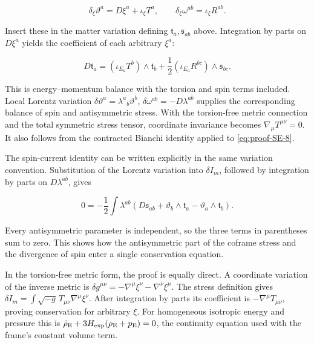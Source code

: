 \documentclass[aps,prx,onecolumn,10pt,notitlepage,nofootinbib,longbibliography]{revtex4-2}
\numberwithin{equation}{section}
\numberwithin{table}{section}
\begin{document}
\begin{equation}
 \delta_\xi \vartheta^a=D\xi^a+\iota_\xi T^a,\qquad
 \delta_\xi\omega^{ab}=\iota_\xi R^{ab}.
 \label{eq:proof-SF-3}
\end{equation}

Insert these in the matter variation defining \(\mathfrak t_a,\mathfrak s_{ab}\) above. Integration by parts on \(D\xi^a\) yields the coefficient of each arbitrary \(\xi^a\):

\begin{equation}
 D\mathfrak t_a=(\iota_{E_a}T^b)\wedge\mathfrak t_b
             +\frac12(\iota_{E_a}R^{bc})\wedge\mathfrak s_{bc}.
 \label{eq:proof-SF-4}
\end{equation}

This is energy--momentum balance with the torsion and spin terms included. Local Lorentz variation \(\delta \vartheta^a=\lambda^a{}_b\vartheta^b\), \(\delta\omega^{ab}=-D\lambda^{ab}\) supplies the corresponding balance of spin and antisymmetric stress. With the torsion-free metric connection and the total symmetric stress tensor, coordinate invariance becomes \(\nabla_\mu T^{\mu\nu}=0\). It also follows from the contracted Bianchi identity applied to \eqref{eq:proof-SE-8}.

The spin-current identity can be written explicitly in the same variation convention. Substitution of the Lorentz variation into \(\delta I_m\), followed by integration by parts on \(D\lambda^{ab}\), gives

\begin{equation}
 0=-\frac12\int\lambda^{ab}
       \left(D\mathfrak s_{ab}+\vartheta_b\wedge\mathfrak t_a-\vartheta_a\wedge\mathfrak t_b\right).
 \label{eq:proof-SF-5}
\end{equation}

Every antisymmetric parameter is independent, so the three terms in parentheses sum to zero. This shows how the antisymmetric part of the coframe stress and the divergence of spin enter a single conservation equation.

In the torsion-free metric form, the proof is equally direct. A coordinate variation of the inverse metric is \(\delta g^{\mu\nu}=-\nabla^\mu\xi^\nu-\nabla^\nu\xi^\mu\). The stress definition gives \(\delta I_m=\int\sqrt{-g}\,T_{\mu\nu}\nabla^\mu\xi^\nu\). After integration by parts its coefficient is \(-\nabla^\mu T_{\mu\nu}\), proving conservation for arbitrary \(\xi\). For homogeneous isotropic energy and pressure this is \(\dot\rho_{\rm E}+3H_{\rm exp}(\rho_{\rm E}+p_{\rm E})=0\), the continuity equation used with the frame's constant volume term.
\end{document}
